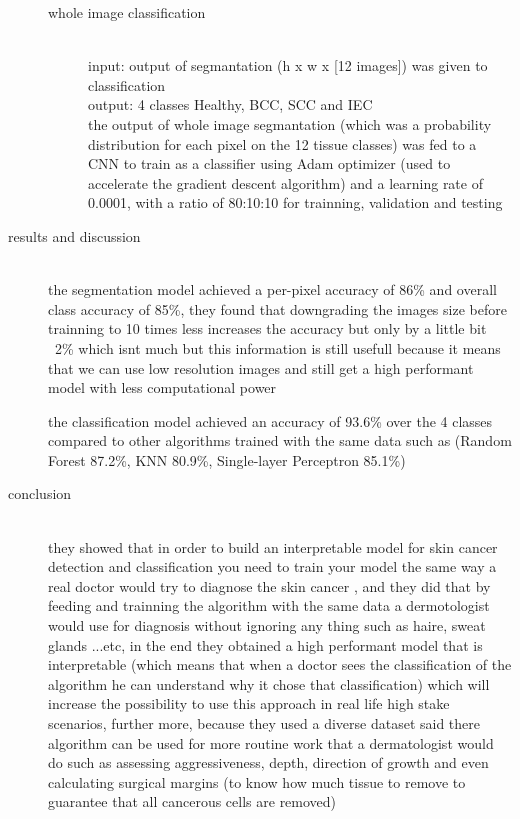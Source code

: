 \begin{description}
\begin{description}
    \item[whole image classification] \hfill \\

        input: output of segmantation (h x w x [12 images]) was given to classification \hfill \\
        output: 4 classes Healthy, BCC, SCC and IEC \hfill \\
        the output of whole image segmantation (which was a probability distribution for each pixel on the 12 tissue classes) was fed to a CNN to train as a classifier using Adam optimizer (used to accelerate the gradient descent algorithm) and a learning rate of 0.0001, with a ratio of 80:10:10 for trainning, validation and testing
    \end{description}


\item[results and discussion] \hfill \\
    the segmentation model achieved a per-pixel accuracy of 86\% and overall class accuracy of 85\%, they found that downgrading the images size before trainning to 10 times less increases the accuracy but only by a little bit ~2\% which isnt much but this information is still usefull because it means that we can use low resolution images and still get a high performant model with less computational power

    the classification model achieved an accuracy of 93.6\% over the 4 classes compared to other algorithms trained with the same data such as (Random Forest 87.2\%, KNN 80.9\%, Single-layer Perceptron 85.1\%)


\item[conclusion] \hfill \\
    they showed that in order to build an interpretable model for skin cancer detection and classification you need to train your model the same way a real doctor would try to diagnose the skin cancer , and they did that by feeding and trainning the algorithm with the same data a dermotologist would use for diagnosis without ignoring any thing such as haire, sweat glands ...etc, in the end they obtained a high performant model that is interpretable (which means that when a doctor sees the classification of the algorithm he can understand why it chose that classification) which will increase the possibility to use this approach in real life high stake scenarios, further more, because they used a diverse dataset said there algorithm can be used for more routine work that a dermatologist would do such as assessing aggressiveness, depth, direction of growth and even calculating surgical margins (to know how much tissue to remove to guarantee that all cancerous cells are removed) 
\end{description}



